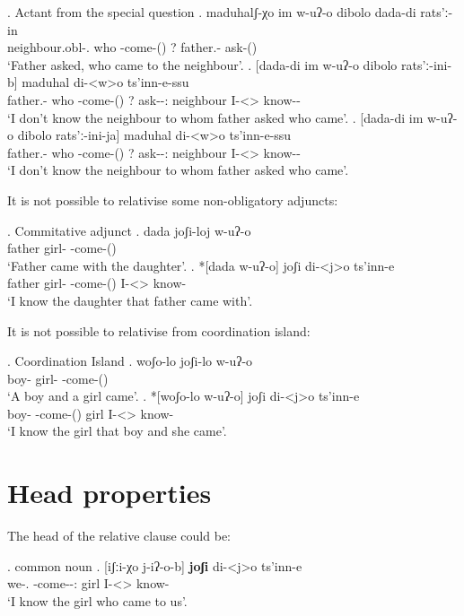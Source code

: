 \ex. Actant from the special question
	\ag. maduhalʃ-χo im w-uʔ-o dibolo dada-di rats'ː-in\\
			{neighbour.obl-\Add.\Lat} who {\M-come-\Pst(\Aor)} ? {father.\Obl-\Erg} {ask-\Pst(\Aor)}\\
			\glt `Father asked, who came to the neighbour'.
	\bg. [dada-di im w-uʔ-o dibolo rats'ː-ini-b]  maduhal di-<w>o ts'inn-e-ssu\\
		{father.\Obl-\Erg}  who {\M-come-\Pst(\Aor)} ?  {ask-\Pst-\Ptcp:\Pst} neighbour {I-<\F>\Aff} {know-\Hab-\Neg}\\
		\glt `I don't know the neighbour to whom father asked who came'.
	\bg. [dada-di im w-uʔ-o dibolo rats'ː-ini-ja]  maduhal di-<w>o ts'inn-e-ssu\\
		{father.\Obl-\Erg}  who {\M-come-\Pst(\Aor)} ?  {ask-\Npst-\Ptcp:\Prae} neighbour {I-<\F>\Aff} {know-\Hab-\Neg}\\
		\glt `I don't know the neighbour to whom father asked who came'.

It is not possible to relativise some non-obligatory adjuncts:

\ex. Commitative adjunct
	\ag. dada joʃi-loj w-uʔ-o\\
			father {girl-\Com} {\M-come-\Pst(\Aor)}\\
			\glt `Father came with the daughter'.	
	\bg. *[dada w-uʔ-o] joʃi di-<j>o ts'inn-e\\
			father {girl-\Com} {\M-come-\Pst(\Aor)} {I-<\F>\Aff} {know-\Hab}\\
			\glt `I know the daughter that father came with'.

It is not possible to relativise from coordination island:

\ex. Coordination Island
	\ag. woʃo-lo joʃi-lo w-uʔ-o\\
			{boy-\Addi} {girl-\Addi} {\M-come-\Pst(\Aor)}\\
			\glt `A boy and a girl came'.	
	\bg. *[woʃo-lo w-uʔ-o] joʃi di-<j>o ts'inn-e\\
			{boy-\Addi} {\M-come-\Pst(\Aor)} girl {I-<\F>\Aff} {know-\Hab}\\
			\glt `I know the girl that boy and she came'.

\section{Head properties}
The head of the relative clause could be:

\ex. common noun
	\ag. [iʃːi-χo j-iʔ-o-b] \textbf{joʃi} di-<j>o ts'inn-e \\
		  {we-\Add.\Lat} {\F-come-\Pst-\Ptcp:\Pst} {girl} {I-<\F>\Aff} {know-\Hab}\\
		 \glt    `I know the girl who came to us'.

